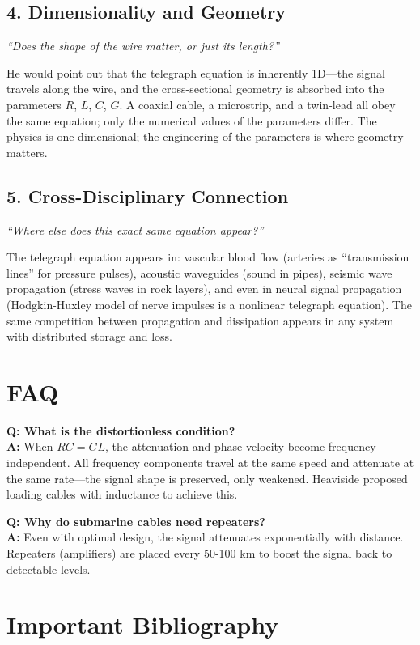 \subsection*{4. Dimensionality and Geometry}
\textit{``Does the shape of the wire matter, or just its length?''}

He would point out that the telegraph equation is inherently 1D---the signal travels along the wire, and the cross-sectional geometry is absorbed into the parameters $R$, $L$, $C$, $G$. A coaxial cable, a microstrip, and a twin-lead all obey the same equation; only the numerical values of the parameters differ. The physics is one-dimensional; the engineering of the parameters is where geometry matters.

\subsection*{5. Cross-Disciplinary Connection}
\textit{``Where else does this exact same equation appear?''}

The telegraph equation appears in: vascular blood flow (arteries as ``transmission lines'' for pressure pulses), acoustic waveguides (sound in pipes), seismic wave propagation (stress waves in rock layers), and even in neural signal propagation (Hodgkin-Huxley model of nerve impulses is a nonlinear telegraph equation). The same competition between propagation and dissipation appears in any system with distributed storage and loss.
\section*{FAQ}

\textbf{Q: What is the distortionless condition?}\\
\textbf{A:} When $RC = GL$, the attenuation and phase velocity become frequency-independent. All frequency components travel at the same speed and attenuate at the same rate---the signal shape is preserved, only weakened. Heaviside proposed loading cables with inductance to achieve this.

\textbf{Q: Why do submarine cables need repeaters?}\\
\textbf{A:} Even with optimal design, the signal attenuates exponentially with distance. Repeaters (amplifiers) are placed every 50-100 km to boost the signal back to detectable levels.
\section*{Important Bibliography}

